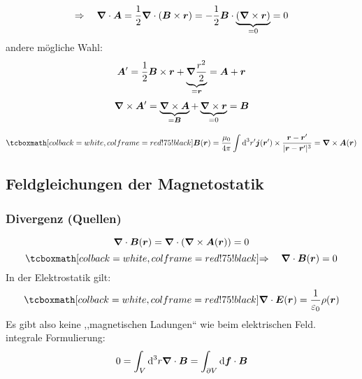 \begin{equation*}
\Rightarrow \quad \bm{\nabla} \cdot \bm{A} = \frac{1}{2} \bm{\nabla} \cdot \left(\bm{B} \times \bm{r}\right) = - \frac{1}{2} \bm{B} \cdot \underbrace{\left(\bm{\nabla} \times \bm{r}\right)}_{= 0} = 0
\end{equation*}
andere mögliche Wahl:
\begin{equation*}
\bm{A}' = \frac{1}{2} \bm{B} \times \bm{r} + \underbrace{\bm{\nabla} \frac{r^2}{2}}_{=\bm{r}} = \bm{A} + \bm{r}
\end{equation*}
\begin{equation*}
\bm{\nabla} \times \bm{A}' = \underbrace{\bm{\nabla} \times \bm{A}}_{= \bm{B}} + \underbrace{\bm{\nabla} \times \bm{r}}_{= 0} = \bm{B}
\end{equation*}


\begin{equation*}
\rmbox{\vec{B}(\vec{r}) = \frac{\mu_0}{4 \pi} \int \dd ^3 r' \vec{j}(\vec{r}') \times \frac{\vec{r} - \vec{r}'}{|\vec{r} - \vec{r}'|^3} = \vabla \times \vec{A}(\vec{r})}
\end{equation*}

\subsection{Feldgleichungen der Magnetostatik}

\subsubsection{Divergenz (Quellen)}

\begin{equation*}
\bm{\nabla} \cdot \bm{B}(\bm{r}) = \bm{\nabla} \cdot (\bm{\nabla} \times \bm{A}(\bm{r})) = 0
\end{equation*}
\begin{equation*}
\rmbox{\Rightarrow \quad \vabla \cdot \vec{B}(\vec{r}) = 0}
\end{equation*}
In der Elektrostatik gilt:
\begin{equation*}
\rmbox{\vabla \cdot \vec{E}(\vec{r}) = \frac{1}{\epsilon_0} \rho(\vec{r})}
\end{equation*}
Es gibt also keine ,,magnetischen Ladungen`` wie beim elektrischen Feld.\\[5pt]
integrale Formulierung:
\begin{equation*}
0 = \int_V \textrm{d}^3 r \bm{\nabla} \cdot \bm{B} = \int_{\partial V} \textrm{d} \bm{f} \cdot \bm{B}
\end{equation*}


